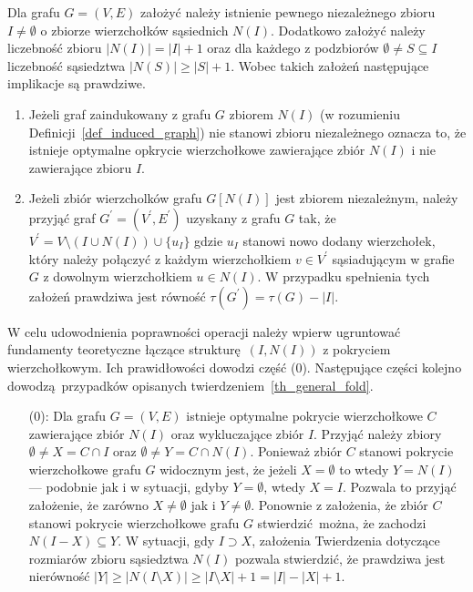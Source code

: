\par{
  \begin{theorem}
    Dla grafu $G=(V,E)$ założyć należy istnienie pewnego niezależnego zbioru $I\neq \emptyset$ o zbiorze wierzchołków sąsiednich $N(I)$.
    Dodatkowo założyć należy liczebność zbioru $|N(I)|=|I| + 1$ oraz dla każdego z podzbiorów $\emptyset \neq S \subseteq I$ liczebność sąsiedztwa $|N(S)| \geq |S| + 1$.
    Wobec takich założeń następujące implikacje są prawdziwe.
    \begin{enumerate}
      \item Jeżeli graf zaindukowany z grafu $G$ zbiorem $N(I)$ (w rozumieniu Definicji~\ref{def_induced_graph}) nie stanowi zbioru niezależnego oznacza to, że istnieje optymalne opkrycie wierzchołkowe zawierające zbiór $N(I)$ i nie zawierające zbioru $I$.
      \item Jeżeli zbiór wierzcholków grafu $G[N(I)]$ jest zbiorem niezależnym, należy przyjąć graf $G^\prime=(V^\prime, E^\prime)$ uzyskany z grafu $G$ tak, że $V^\prime=V \setminus (I \cup N(I)) \cup \{u_I\}$ gdzie $u_I$ stanowi nowo dodany wierzchołek, który należy połączyć z każdym wierzchołkiem $v \in V^\prime$ sąsiadującym w grafie $G$ z dowolnym wierzchołkiem $u \in N(I)$.
      W przypadku spełnienia tych założeń prawdziwa jest równość $\tau(G^\prime)=\tau(G)-|I|$.
    \end{enumerate}
  \end{theorem}
  \begin{bproof} W celu udowodnienia poprawności operacji należy wpierw ugruntować fundamenty teoretyczne łączące strukturę $(I, N(I))$ z pokryciem wierzchołkowym.
    Ich prawidłowości dowodzi część (0).
    Następujące części kolejno dowodzą przypadków opisanych twierdzeniem~\ref{th_general_fold}.
    \begin{itemize}
      \item[(0):] Dla grafu $G=(V, E)$ istnieje optymalne pokrycie wierzchołkowe $C$ zawierające zbiór $N(I)$ oraz wykluczające zbiór $I$.
      Przyjąć należy zbiory $\emptyset \neq X=C \cap I$ oraz $\emptyset \neq Y=C \cap N(I)$.
      Ponieważ zbiór $C$ stanowi pokrycie wierzchołkowe grafu $G$ widocznym jest, że jeżeli $X=\emptyset$ to wtedy $Y=N(I)$ --- podobnie jak i w sytuacji, gdyby $Y=\emptyset$, wtedy $X=I$.
      Pozwala to przyjąć założenie, że zarówno $X\neq \emptyset$ jak i $Y\neq \emptyset$.
      Ponownie z założenia, że zbiór $C$ stanowi pokrycie wierzchołkowe grafu $G$ stwierdzić można, że zachodzi $N(I-X)\subseteq Y$.
      W sytuacji, gdy $I \supset X$, założenia Twierdzenia dotyczące rozmiarów zbioru sąsiedztwa $N(I)$ pozwala stwierdzić, że prawdziwa jest nierówność $|Y| \geq |N(I \setminus X)| \geq |I \setminus X| + 1 = |I| - |X| + 1$.

\end{itemize}
\end{bproof}}
